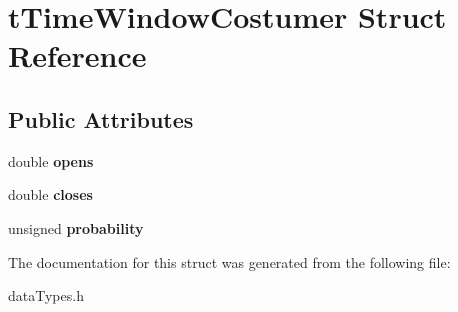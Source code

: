 \hypertarget{structt_time_window_costumer}{
\section{tTimeWindowCostumer Struct Reference}
\label{structt_time_window_costumer}
}
\subsection*{Public Attributes}
\begin{DoxyCompactItemize}
\item 
\hypertarget{structt_time_window_costumer_a0c3aa90deb3da551f2762f512f2c94d7}{
double {\bfseries opens}}
\label{structt_time_window_costumer_a0c3aa90deb3da551f2762f512f2c94d7}

\item 
\hypertarget{structt_time_window_costumer_a59c722ef06a572b3f06f61a16d922fc3}{
double {\bfseries closes}}
\label{structt_time_window_costumer_a59c722ef06a572b3f06f61a16d922fc3}

\item 
\hypertarget{structt_time_window_costumer_a0f99ecea5b6db64fb6062a93961ef11a}{
unsigned {\bfseries probability}}
\label{structt_time_window_costumer_a0f99ecea5b6db64fb6062a93961ef11a}

\end{DoxyCompactItemize}


The documentation for this struct was generated from the following file:\begin{DoxyCompactItemize}
\item 
dataTypes.h\end{DoxyCompactItemize}
